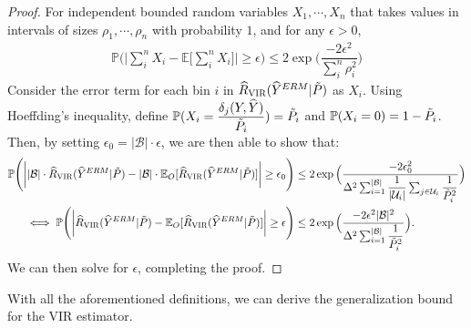 \begin{proof}
For independent bounded random variables $X_{1}, \cdots, X_{n}$ that takes values in intervals of sizes $\rho_{1}, \cdots, \rho_{n}$ with probability $1$, and for any $\epsilon > 0$,
%
\begin{align*}
    \mathbb{P} \Bigg( \bigg| \sum_{i}^{n} X_{i} - \mathbb{E} \Big[ \sum_{i}^{n} X_{i} \Big] \bigg| \geq \epsilon \Bigg) \leq 2 \exp \Big(\dfrac{-2 \epsilon^{2}}{\sum_{i}^{n} \rho_{i}^{2}} \Big)
\end{align*}
%
{Consider the error term for each bin $i$ in $\hat{R}_{\textsc{VIR}} (\hat{Y}^{ERM} | \Tilde{P})$ as $X_i$. Using Hoeffding's inequality, define $\mathbb{P} (X_{i} = \dfrac{\delta_{j} (Y, \hat{Y})}{\Tilde{P}_{i}}) = \Tilde{P}_{i}$ and $\mathbb{P} (X_{i} = 0) = 1 - \Tilde{P}_{i}$. Then, by setting $\epsilon_{0} = |\mathcal{B}| \cdot \epsilon$, we are then able to show that:}
\begingroup\makeatletter\def\f@size{9.5}\check@mathfonts
\def\maketag@@@#1{\hbox{\m@th\normalsize\normalfont#1}}%
\begin{align*}
    \mathbb{P} \Bigg( \bigg| |\mathcal{B}| \cdot \hat{R}_{\textsc{VIR}} (\hat{Y}^{ERM} | \Tilde{P}) - |\mathcal{B}| \cdot \mathbb{E}_{O} [\hat{R}_{\textsc{VIR}} (\hat{Y}^{ERM} | \Tilde{P})] \bigg| \geq \epsilon_{0} \Bigg) &\leq 2 \exp \Big(\dfrac{-2 \epsilon_{0}^{2}}{\Delta^{2} \sum_{i=1}^{|\mathcal{B}|} \dfrac{1}{|\mathcal{U}_{i}|} \sum_{j \in \mathcal{U}_{i}} \dfrac{1}{\Tilde{P}_{i}^{2}}} \Big) \\
    \iff \mathbb{P} \Bigg( \bigg| \hat{R}_{\textsc{VIR}} (\hat{Y}^{ERM} | \Tilde{P}) - \mathbb{E}_{O} [\hat{R}_{\textsc{VIR}} (\hat{Y}^{ERM} | \Tilde{P})] \bigg| \geq \epsilon \Bigg) &\leq 2 \exp \Big(\dfrac{-2 \epsilon^{2} |\mathcal{B}|^{2}}{ \Delta^{2} \sum_{i=1}^{|\mathcal{B}|} \dfrac{1}{\Tilde{P}_{i}^{2}}} \Big).
\end{align*}
\endgroup
{We can then solve for $\epsilon$, completing the proof.}
\end{proof}

With all the aforementioned definitions, we can derive the generalization bound for the VIR estimator.

